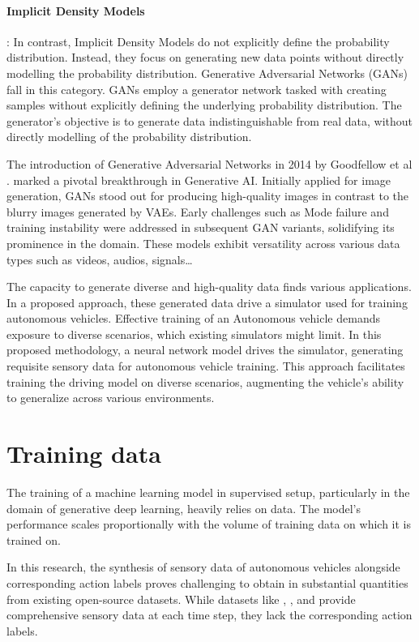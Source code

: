 \documentclass[12pt,twoside,a4paper,parskip]{scrbook} %
\begin{document}
\paragraph*{Implicit Density Models}:
In contrast, Implicit Density Models do not explicitly define the probability distribution. Instead, they focus on generating new data points without directly modelling the probability distribution. Generative Adversarial Networks (GANs) fall in this category. GANs employ a generator network tasked with creating samples without explicitly defining the underlying probability distribution. The generator's objective is to generate data indistinguishable from real data, without directly modelling of the probability distribution.

The introduction of Generative Adversarial Networks in 2014 by Goodfellow et al \cite{7_gan}. marked a pivotal breakthrough in Generative AI. Initially applied for image generation, GANs stood out for producing high-quality images in contrast to the blurry images generated by VAEs. Early challenges such as Mode failure and training instability were addressed in subsequent GAN variants, solidifying its prominence in the domain. These models exhibit versatility across various data types such as videos, audios, signals…

The capacity to generate diverse and high-quality data finds various applications. In a proposed approach, these generated data drive a simulator used for training autonomous vehicles. Effective training of an Autonomous vehicle demands exposure to diverse scenarios, which existing simulators might limit. In this proposed methodology, a neural network model drives the simulator, generating requisite sensory data for autonomous vehicle training. This approach facilitates training the driving model on diverse scenarios, augmenting the vehicle's ability to generalize across various environments.

\section{Training data}
The training of a machine learning model in supervised setup, particularly in the domain of generative deep learning, heavily relies on data. The model's performance scales proportionally with the volume of training data on which it is trained on.

In this research, the synthesis of sensory data of autonomous vehicles alongside corresponding action labels proves challenging to obtain in substantial quantities from existing open-source datasets. While datasets like \cite{18_Waymo}, \cite{19_audi}, \cite{20_cityscapes} and \cite{21_panda} provide comprehensive sensory data at each time step, they lack the corresponding action labels.
\end{document}

